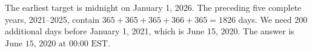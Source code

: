 The earliest target is midnight on January 1, 2026. The preceding five complete years, 2021--2025, contain $365+365+365+366+365=1826$ days. We need 200 additional days before January 1, 2021, which is June 15, 2020. The answer is $\boxed{\text{June 15, 2020 at 00:00 EST}}$.
